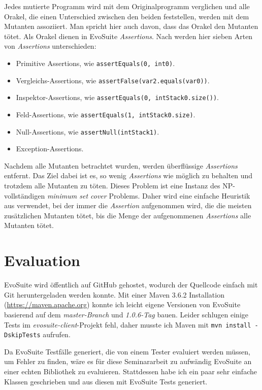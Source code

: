 \documentclass[a4paper,11pt]{article}
\begin{document}
Jedes mutierte Programm wird mit dem Originalprogramm verglichen und alle Orakel, die einen Unterschied zwischen den beiden feststellen, werden mit dem Mutanten assoziiert.
Man spricht hier auch davon, dass das Orakel den Mutanten tötet.
Als Orakel dienen in EvoSuite \textit{Assertions}.
Nach \citep{TSE12_Mutation} werden hier sieben Arten von \textit{Assertions} unterschieden:
\begin{itemize}
	\item Primitive Assertions, wie \lstinline{assertEquals(0, int0)}.
	\item Vergleichs-Assertions, wie \lstinline{assertFalse(var2.equals(var0))}.
	\item Inspektor-Assertions, wie \lstinline{assertEquals(0, intStack0.size())}.
	\item Feld-Assertions, wie \lstinline{assertEquals(1, intStack0.size)}.
	\item Null-Assertions, wie \lstinline{assertNull(intStack1)}.
	\item Exception-Assertions.
\end{itemize}
Nachdem alle Mutanten betrachtet wurden, werden überflüssige \textit{Assertions} entfernt.
Das Ziel dabei ist es, so wenig \textit{Assertions} wie möglich zu behalten und trotzdem alle Mutanten zu töten.
Dieses Problem ist eine Instanz des NP-vollständigen \textit{minimum set cover} Problems.
Daher wird eine einfache Heuristik aus \cite{chvatal1979greedy} verwendet, bei der immer die \textit{Assertion} aufgenommen wird, die die meisten zusätzlichen Mutanten tötet, bis die Menge der aufgenommenen \textit{Assertions} alle Mutanten tötet.

\section{Evaluation}

EvoSuite wird öffentlich auf GitHub gehostet, wodurch der Quellcode einfach mit Git heruntergeladen werden konnte.
Mit einer Maven 3.6.2 Installation (\url{https://maven.apache.org}) konnte ich leicht eigene Versionen von EvoSuite basierend auf dem \textit{master-Branch} und \textit{1.0.6-Tag} bauen.
Leider schlugen einige Tests im \textit{evosuite-client}-Projekt fehl, daher musste ich Maven mit \texttt{mvn install -DskipTests} aufrufen.

Da EvoSuite Testfälle generiert, die von einem Tester evaluiert werden müssen, um Fehler zu finden, wäre es für diese Seminararbeit zu aufwändig EvoSuite an einer echten Bibliothek zu evaluieren.
Stattdessen habe ich ein paar sehr einfache Klassen geschrieben und aus diesen mit EvoSuite Tests generiert.
\end{document}
